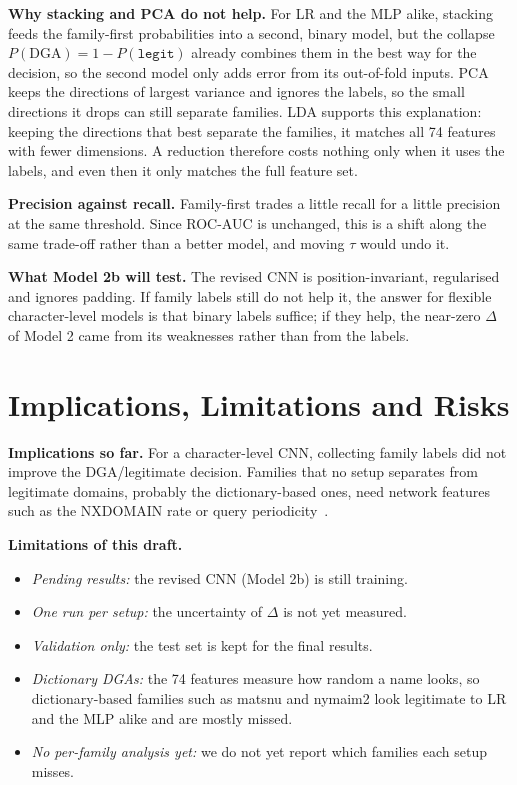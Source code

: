 \documentclass[11pt]{article}
\begin{document}
\textbf{Why stacking and PCA do not help.} For LR and the MLP alike, stacking feeds
the family-first probabilities into a second, binary model, but the collapse
$P(\text{DGA}) = 1 - P(\texttt{legit})$ already combines them in the best way for the
decision, so the second model only adds error from its out-of-fold inputs. PCA
keeps the directions of largest variance and ignores the labels, so the small
directions it drops can still separate families. LDA supports this explanation:
keeping the directions that best separate the families, it matches all 74
features with fewer dimensions. A reduction therefore costs nothing only when it
uses the labels, and even then it only matches the full feature set.

\textbf{Precision against recall.} Family-first trades a little recall for a
little precision at the same threshold. Since ROC-AUC is unchanged, this is a
shift along the same trade-off rather than a better model, and moving $\tau$
would undo it.

\textbf{What Model 2b will test.} The revised CNN is position-invariant,
regularised and ignores padding. If family labels still do not help it, the answer
for flexible character-level models is that binary labels suffice; if they help,
the near-zero $\Delta$ of Model 2 came from its weaknesses rather than from the
labels.

\section{Implications, Limitations and Risks}\label{sec:limits}
\textbf{Implications so far.} For a character-level CNN, collecting family labels
did not improve the DGA/legitimate decision. Families that no setup separates from
legitimate domains, probably the dictionary-based ones, need network features
such as the NXDOMAIN rate or query periodicity~\cite{antonakakis2012pleiades}.

\textbf{Limitations of this draft.}
\begin{itemize}
  \item \emph{Pending results:} the revised CNN (Model 2b) is still training.
  \item \emph{One run per setup:} the uncertainty of $\Delta$ is not yet measured.
  \item \emph{Validation only:} the test set is kept for the final results.
  \item \emph{Dictionary DGAs:} the 74 features measure how random a name looks,
  so dictionary-based families such as matsnu and nymaim2 look legitimate to LR
  and the MLP alike and are mostly missed.
  \item \emph{No per-family analysis yet:} we do not yet report which families
  each setup misses.
\end{itemize}
\end{document}
